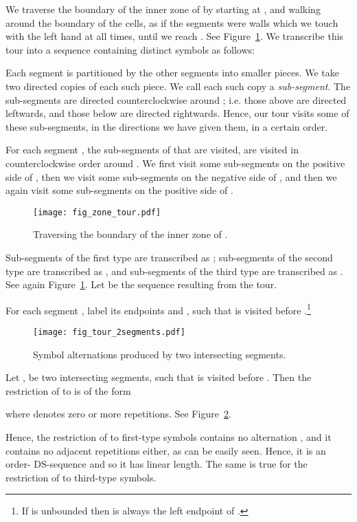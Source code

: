 \documentclass[11pt]{article}
\theoremstyle{definition}
\theoremstyle{remark}
\begin{document}
We traverse the boundary of the inner zone of  by starting at , and walking around the boundary of the cells, as if the segments were walls which we touch with the left hand at all times, until we reach . See Figure~\ref{fig_zone_tour}. We transcribe this tour into a sequence containing  distinct symbols as follows:

Each segment  is partitioned by the other segments into smaller pieces. We take two directed copies of each such piece. We call each such copy a \emph{sub-segment}. The sub-segments are directed counterclockwise around ; i.e. those above  are directed leftwards, and those below  are directed rightwards. Hence, our tour visits some of these sub-segments, in the directions we have given them, in a certain order.

For each segment , the sub-segments of  that are visited, are visited in counterclockwise order around . We first visit some sub-segments on the positive side of , then we visit some sub-segments on the negative side of , and then we again visit some sub-segments on the positive side of .

\begin{figure}
\centerline{\texttt{[image: fig\_zone\_tour.pdf]}}
\caption{\label{fig_zone_tour}Traversing the boundary of the inner zone of .}
\end{figure}

Sub-segments of the first type are transcribed as ; sub-segments of the second type are transcribed as , and sub-segments of the third type are transcribed as . See again Figure~\ref{fig_zone_tour}. Let  be the sequence resulting from the tour.

For each segment , label its endpoints  and , such that  is visited before .\footnote{If  is unbounded then  is always the left endpoint of .}

\begin{figure}
\centerline{\texttt{[image: fig\_tour\_2segments.pdf]}}
\caption{\label{fig_tour_2segments}Symbol alternations produced by two intersecting segments.}
\end{figure}

Let ,  be two intersecting segments, such that  is visited before . Then the restriction of  to  is of the form

where  denotes zero or more repetitions. See Figure~\ref{fig_tour_2segments}.

Hence, the restriction of  to first-type symbols contains no alternation , and it contains no adjacent repetitions either, as can be easily seen. Hence, it is an order- DS-sequence and so it has linear length. The same is true for the restriction of  to third-type symbols.
\end{document}
